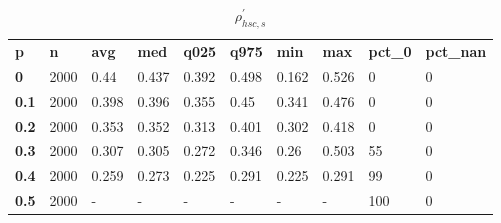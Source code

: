 \begin{table}[h]
 \centering 
\footnotesize
\caption{$\rho_{hsc,s}^\prime $}
\label{tab:alphahscs}
\begin{tabular}[h]{| l l l l l l l l l l|
    } \hline
\textbf{ p} & \textbf{ n} & \textbf{ avg} & \textbf{ med} & \textbf{ q025} & \textbf{ q975} & \textbf{ min} & \textbf{ max} & \textbf{ pct\_0} & \textbf{ pct\_nan}
           \\
  \textbf{  0} & 2000 &  0.44 & 0.437 & 0.392 & 0.498 & 0.162 & 0.526 &   0 & 0
           \\
  \textbf{0.1} & 2000 & 0.398 & 0.396 & 0.355 &  0.45 & 0.341 & 0.476 &   0 & 0
           \\
  \textbf{0.2} & 2000 & 0.353 & 0.352 & 0.313 & 0.401 & 0.302 & 0.418 &   0 & 0
           \\
  \textbf{0.3} & 2000 & 0.307 & 0.305 & 0.272 & 0.346 &  0.26 & 0.503 &  55 & 0
           \\
  \textbf{0.4} & 2000 & 0.259 & 0.273 & 0.225 & 0.291 & 0.225 & 0.291 &  99 & 0
           \\
  \textbf{0.5} & 2000 & - & - & - & - & - & - & 100 & 0
           \\
 \hline \end{tabular}
 \end{table}
